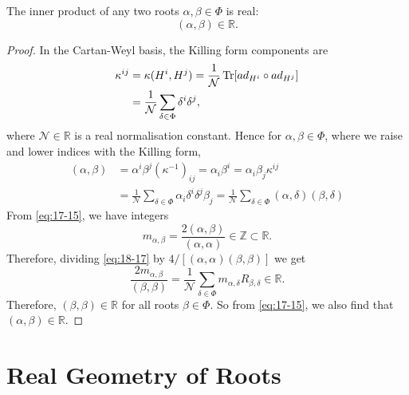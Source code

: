 
\begin{claim}
  The inner product of any two roots $\alpha, \beta \in \Phi$ is real:
  \begin{equation}
    (\alpha, \beta) \in \mathbb{R}.
  \end{equation}
\end{claim}
\begin{proof}
  In the Cartan-Weyl basis, the Killing form components are
  \begin{align}
    \kappa^{ij} &= \kappa(H^{i}, H^{j}) = \frac{1}{\mathcal{N}} \Tr[ad_{H^{i}} \circ ad_{H^{j}}] \\
     &= \frac{1}{\mathcal{N}} \sum_{\delta \in \Phi} \delta^{i} \delta^{j},
  \end{align}
  where $\mathcal{N} \in \mathbb{R}$ is a real normalisation constant.
  Hence for $\alpha, \beta \in \Phi$, where we raise and lower indices with the Killing form, 
  \begin{align}
    (\alpha, \beta) &= \alpha^{i} \beta^{j}(\kappa^{-1})_{ij} = \alpha_{i} \beta^{i} = \alpha_{i} \beta_{j} \kappa^{ij} \\
		    &= \frac{1}{\mathcal{N}} \sum_{\delta \in \Phi} \alpha_{i} \delta^{i} \delta^{j} \beta_{j} = \frac{1}{\mathcal{N}} \sum_{\delta \in \Phi} (\alpha, \delta) (\beta,\delta) \label{eq:18-17}
  \end{align}
  From \eqref{eq:17-15}, we have integers
  \begin{equation}
    m_{\alpha, \beta} = \frac{2 (\alpha, \beta)}{(\alpha, \alpha)} \in \mathbb{Z} \subset \mathbb{R}.
  \end{equation}
  Therefore, dividing \eqref{eq:18-17} by $4 / [(\alpha, \alpha) (\beta, \beta)]$ we get
  \begin{equation}
    \frac{2 m_{\alpha, \beta}}{(\beta, \beta)} = \frac{1}{\mathcal{N}} \sum_{\delta \in \Phi} m_{\alpha, \delta} R_{\beta, \delta} \in \mathbb{R}.
  \end{equation}
  Therefore, $(\beta, \beta) \in \mathbb{R}$ for all roots $\beta \in \Phi$. So from \eqref{eq:17-15}, we also find that $ (\alpha, \beta) \in \mathbb{R}$.
\end{proof}

\section{Real Geometry of Roots}%
\label{sec:real_geometry_of_roots}

